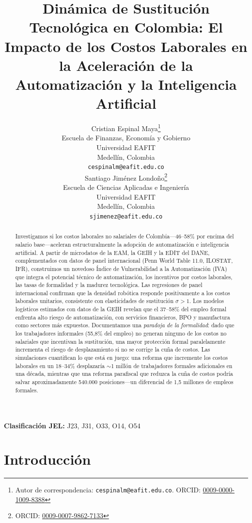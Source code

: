 \documentclass{article}
\title{Din\'amica de Sustituci\'on Tecnol\'ogica en Colombia: El Impacto de los Costos Laborales en la Aceleraci\'on de la Automatizaci\'on y la Inteligencia Artificial}
\author{
 Cristian Espinal Maya\thanks{Autor de correspondencia: \texttt{cespinalm@eafit.edu.co}. ORCID: \href{https://orcid.org/0009-0000-1009-8388}{0009-0000-1009-8388}} \\
  Escuela de Finanzas, Econom\'ia y Gobierno\\
  Universidad EAFIT\\
  Medell\'in, Colombia \\
  \texttt{cespinalm@eafit.edu.co} \\
  \And
 Santiago Jim\'enez Londo\~no\thanks{ORCID: \href{https://orcid.org/0009-0007-9862-7133}{0009-0007-9862-7133}} \\
  Escuela de Ciencias Aplicadas e Ingenier\'ia\\
  Universidad EAFIT\\
  Medell\'in, Colombia \\
  \texttt{sjimenez@eafit.edu.co} \\
}
\begin{document}
\maketitle

\begin{abstract}
Investigamos si los costos laborales no salariales de Colombia---46--58\% por encima del salario base---aceleran estructuralmente la adopci\'on de automatizaci\'on e inteligencia artificial. A partir de microdatos de la EAM, la GEIH y la EDIT del DANE, complementados con datos de panel internacional (Penn World Table 11.0, ILOSTAT, IFR), construimos un novedoso \'Indice de Vulnerabilidad a la Automatizaci\'on (IVA) que integra el potencial t\'ecnico de automatizaci\'on, los incentivos por costos laborales, las tasas de formalidad y la madurez tecnol\'ogica. Las regresiones de panel internacional confirman que la densidad rob\'otica responde positivamente a los costos laborales unitarios, consistente con elasticidades de sustituci\'on $\sigma > 1$. Los modelos log\'isticos estimados con datos de la GEIH revelan que el 37--58\% del empleo formal enfrenta alto riesgo de automatizaci\'on, con servicios financieros, BPO y manufactura como sectores m\'as expuestos. Documentamos una \textit{paradoja de la formalidad}: dado que los trabajadores informales (55,8\% del empleo) no generan ninguno de los costos no salariales que incentivan la sustituci\'on, una mayor protecci\'on formal paralelamente incrementa el riesgo de desplazamiento si no se corrige la cu\~na de costos. Las simulaciones cuantifican lo que est\'a en juego: una reforma que incremente los costos laborales en un 18--34\% desplazar\'ia $\sim$1 mill\'on de trabajadores formales adicionales en una d\'ecada, mientras que una reforma parafiscal que reduzca la cu\~na de costos podr\'ia salvar aproximadamente 540.000 posiciones---un diferencial de 1,5 millones de empleos formales.
\end{abstract}


\noindent\textbf{Clasificaci\'on JEL:} J23, J31, O33, O14, O54


\FloatBarrier

\section{Introducci\'on}
\label{sec:introduction}
\end{document}

